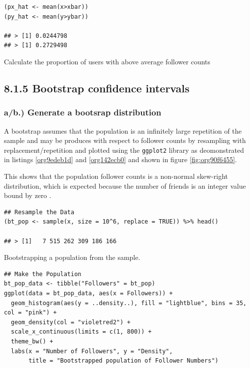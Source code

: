 \documentclass[11pt]{article}
\begin{document}
\begin{listing}[htbp]
\begin{verbatim}
(px_hat <- mean(x>xbar))
(py_hat <- mean(y>ybar))

## > [1] 0.0244798
## > [1] 0.2729498
\end{verbatim}
\caption{\label{org6439384}Calculate the proportion of users with above average follower counts}
\end{listing}


\subsection{8.1.5 Bootstrap confidence intervals}
\label{sec:orgfb83ecc}
\subsubsection{a/b.) Generate a bootsrap distribution}
\label{sec:org8e33db1}

A bootstrap assumes that the population is an infinitely large repetition of the
sample and may be produces with respect to follower counts by resampling with
replacement/repetition and plotted using the \texttt{ggplot2} library as deomonstrated
in listings \ref{org9edeb1d} and \ref{org142ecb0} and shown in figure \ref{fig:org90f6455}.

This shows that the population follower counts is a non-normal skew-right
distribution, which is expected because the number of friends is an integer value bound by zero \cite{nist2013}.

\begin{listing}[htbp]
\begin{verbatim}
## Resample the Data
(bt_pop <- sample(x, size = 10^6, replace = TRUE)) %>% head()

## > [1]   7 515 262 309 186 166
\end{verbatim}
\caption{\label{org9edeb1d}Bootstrapping a population from the sample.}
\end{listing}

\begin{listing}[htbp]
\begin{verbatim}
## Make the Population
bt_pop_data <- tibble("Followers" = bt_pop)
ggplot(data = bt_pop_data, aes(x = Followers)) +
  geom_histogram(aes(y = ..density..), fill = "lightblue", bins = 35, col = "pink") +
  geom_density(col = "violetred2") +
  scale_x_continuous(limits = c(1, 800)) +
  theme_bw() +
  labs(x = "Number of Followers", y = "Density",
       title = "Bootstrapped population of Follower Numbers")

\end{verbatim}
\label{org142ecb0}
\end{listing}
\end{document}
